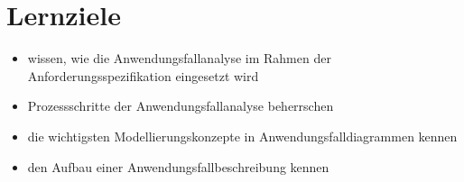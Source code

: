 \section{Lernziele}
\begin{itemize}
    \item wissen, wie die Anwendungsfallanalyse im Rahmen der Anforderungsspezifikation eingesetzt wird
    \item Prozessschritte der Anwendungsfallanalyse beherrschen
    \item die wichtigsten Modellierungskonzepte in Anwendungsfalldiagrammen kennen
    \item den Aufbau einer Anwendungsfallbeschreibung kennen
\end{itemize}